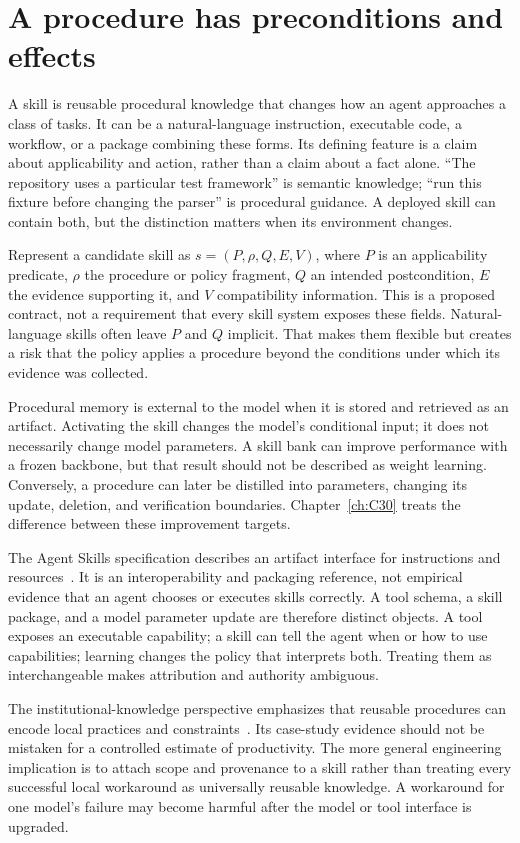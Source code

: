 \section{A procedure has preconditions and effects}\label{sec:C15:procedure}
A skill is reusable procedural knowledge that changes how an agent approaches a class of tasks. It can be a natural-language instruction, executable code, a workflow, or a package combining these forms. Its defining feature is a claim about applicability and action, rather than a claim about a fact alone. ``The repository uses a particular test framework'' is semantic knowledge; ``run this fixture before changing the parser'' is procedural guidance. A deployed skill can contain both, but the distinction matters when its environment changes.

Represent a candidate skill as $s=(P,\rho,Q,E,V)$, where $P$ is an applicability predicate, $\rho$ the procedure or policy fragment, $Q$ an intended postcondition, $E$ the evidence supporting it, and $V$ compatibility information. This is a proposed contract, not a requirement that every skill system exposes these fields. Natural-language skills often leave $P$ and $Q$ implicit. That makes them flexible but creates a risk that the policy applies a procedure beyond the conditions under which its evidence was collected.

Procedural memory is external to the model when it is stored and retrieved as an artifact. Activating the skill changes the model's conditional input; it does not necessarily change model parameters. A skill bank can improve performance with a frozen backbone, but that result should not be described as weight learning. Conversely, a procedure can later be distilled into parameters, changing its update, deletion, and verification boundaries. Chapter~\ref{ch:C30} treats the difference between these improvement targets.

The Agent Skills specification describes an artifact interface for instructions and resources~\cite{agentskills2026spec}. It is an interoperability and packaging reference, not empirical evidence that an agent chooses or executes skills correctly. A tool schema, a skill package, and a model parameter update are therefore distinct objects. A tool exposes an executable capability; a skill can tell the agent when or how to use capabilities; learning changes the policy that interprets both. Treating them as interchangeable makes attribution and authority ambiguous.

The institutional-knowledge perspective emphasizes that reusable procedures can encode local practices and constraints~\cite{corpus260314805}. Its case-study evidence should not be mistaken for a controlled estimate of productivity. The more general engineering implication is to attach scope and provenance to a skill rather than treating every successful local workaround as universally reusable knowledge. A workaround for one model's failure may become harmful after the model or tool interface is upgraded.

